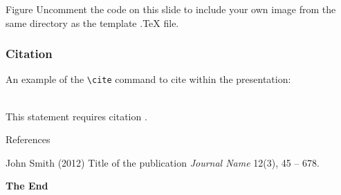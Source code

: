 \documentclass[aspectratio=169,xcolor=dvipsnames]{beamer}
\begin{document}

\begin{frame}{Figure}
    Uncomment the code on this slide to include your own image from the same directory as the template .TeX file.
\end{frame}


\begin{frame}[fragile] %
    \frametitle{Citation}
    An example of the \verb|\cite| command to cite within the presentation:\\~

    This statement requires citation \cite{p1}.
\end{frame}


\begin{frame}{References}
    \footnotesize{
        \begin{thebibliography}{99}
             John Smith (2012)
            \newblock Title of the publication
            \newblock \emph{Journal Name} 12(3), 45 -- 678.
        \end{thebibliography}
    }
\end{frame}


\begin{frame}
    \Huge{\centerline{\textbf{The End}}}
\end{frame}

\end{document}
